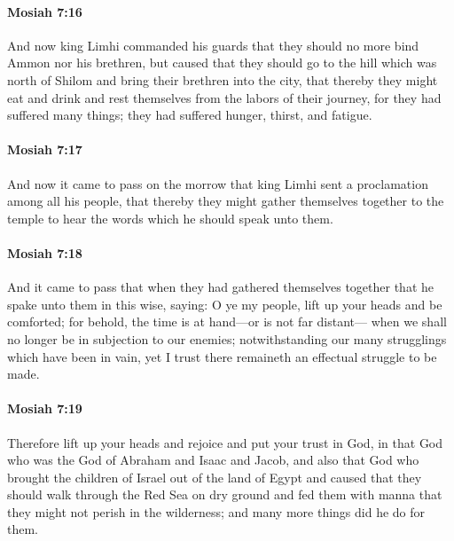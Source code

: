 		\paragraph{Mosiah 7:16} %
			\label{MOSIAH-7-16}

			And now king Limhi commanded his guards
			that they should no more bind Ammon nor his brethren,
			but caused that they should go to the hill which was north of Shilom
			and bring their brethren into the city,
			that thereby they might eat and drink
			and rest themselves from the labors of their journey,
			for they had suffered many things;
			they had suffered hunger, thirst, and fatigue.

		\paragraph{Mosiah 7:17} %
			\label{MOSIAH-7-17}

			And now it came to pass on the morrow
			that king Limhi sent a proclamation among all his people,
			that thereby they might gather themselves together to the temple
			to hear the words which he should speak unto them.

		\paragraph{Mosiah 7:18} %
			\label{MOSIAH-7-18}

			And it came to pass that when they had gathered themselves together
			that he spake unto them in this wise, saying:
			O ye my people, lift up your heads and be comforted;
			for behold, the time is at hand---or is not far distant---
			when we shall no longer be in subjection to our enemies;
			notwithstanding our many strugglings which have been in vain,
			yet I trust there remaineth an effectual struggle to be made.

		\paragraph{Mosiah 7:19} %
			\label{MOSIAH-7-19}

			Therefore lift up your heads and rejoice and put your trust in God,
			in that God who was the God of Abraham and Isaac and Jacob,
			and also that God who brought the children of Israel out of the land of Egypt
			and caused that they should walk through the Red Sea on dry ground
			and fed them with manna that they might not perish in the wilderness;
			and many more things did he do for them.

